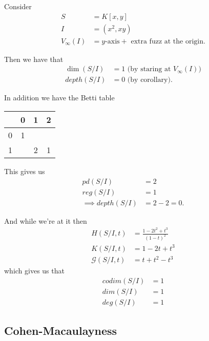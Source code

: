 \begin{example}
    Consider
    \begin{align*}
        S &= K[x,y]\\
        I &= (x^2, xy)\\
        V_\infty (I) &= y \text{-axis} + \text{ extra fuzz at the origin}.
    \end{align*}

    Then we have that
    \begin{align*}
        \dim (S/I ) &= 1 \text{ (by staring at $V_\infty (I)$)}\\
        depth (S/I) &= 0 \text{ (by corollary)}.
    \end{align*}

    In addition we have the Betti table

    \begin{center}
    \begin{tabular}{ c | c c c }
      & 0 & 1 & 2 \\
    \hline
    0 & 1 &   &   \\
    1 &   & 2 & 1 \\
    \end{tabular}
    \end{center}
    This gives us
    \begin{align*}
        pd(S/I) &= 2\\
        reg(S/I) &= 1\\
        \implies depth(S/I) &= 2-2 = 0.
    \end{align*}

    And while we're at it then
    \begin{align*}
        H(S/I, t) &= \frac{1 -2t^2 +t^3}{(1-t)^2}\\
        K(S/I, t) &=1 -2t +t^3\\
        \mathscr{G} (S/I, t) &= t+t^2 - t^3
    \end{align*}
    which gives us that
    \begin{align*}
        codim(S/I) &= 1\\
        dim(S/I) &= 1\\
        deg(S/I) &= 1
    \end{align*}
\end{example}

\subsection{Cohen-Macaulayness}

